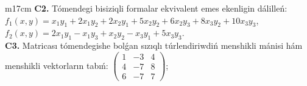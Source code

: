 \documentclass{article}
\begin{document}
\begin{tabular}{m{17cm}}
\textbf{C2.} Tómendegi bisiziqli formalar ekvivalent emes ekenligin dálilleń:\(f_{1}(x,y) = x_{1}y_{1} + 2x_{1}y_{2} + 2x_{2}y_{1} + 5x_{2}y_{2} + 6x_{2}y_{3} + 8x_{3}y_{2} + 10x_{3}y_{3}\), \(f_{2}(x,y) = 2x_{1}y_{1} - x_{1}y_{3} + x_{2}y_{2} - x_{3}y_{1} + 5x_{3}y_{3}\). \\
\textbf{C3.} Matricası tómendegishe bolǵan sızıqlı túrlendiriwdiń menshikli mánisi hám menshikli vektorların tabıń: \(\begin{pmatrix} 1 & - 3 & 4 \\ 4 & - 7 & 8 \\ 6 & - 7 & 7 \end{pmatrix}\); \\

\end{tabular}
\vspace{1cm}
\end{document}
